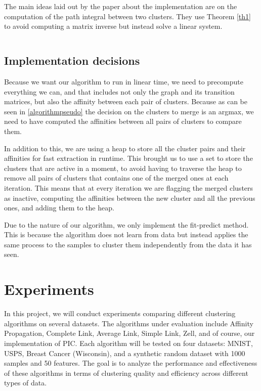 \documentclass[
	10pt,
	parskip=half-,	
	paper=a4,
	english
	]{scrartcl}
\begin{document}
The main ideas laid out by the paper about the implementation are on the computation of the path integral between two clusters. They use Theorem \ref{th1} to avoid computing a matrix inverse but instead solve a linear system.

\begin{equation}
    \label{th1}
\end{equation}


\subsection{Implementation decisions}

Because we want our algorithm to run in linear time, we need to precompute everything we can, and that includes not only the graph and its transition matrices, but also the affinity between each pair of clusters. Because as can be seen in \ref{algorithmpseudo} the decision on the clusters to merge is an argmax, we need to have computed the affinities between all pairs of clusters to compare them.

In addition to this, we are using a heap to store all the cluster pairs and their affinities for fast extraction in runtime. This brought us to use a set to store the clusters that are active in a moment, to avoid having to traverse the heap to remove all pairs of clusters that contains one of the merged ones at each iteration. This means that at every iteration we are flagging the merged clusters as inactive, computing the affinities between the new cluster and all the previous ones, and adding them to the heap.

Due to the nature of our algorithm, we only implement the fit-predict method. This is because the algorithm does not learn from data but instead applies the same process to the samples to cluster them independently from the data it has seen.

\section {Experiments}

In this project, we will conduct experiments comparing different clustering algorithms on several datasets. The algorithms under evaluation include Affinity Propagation, Complete Link, Average Link, Simple Link, Zell, and of course, our implementation of PIC. Each algorithm will be tested on four datasets: MNIST, USPS, Breast Cancer (Wisconsin), and a synthetic random dataset with 1000 samples and 50 features. The goal is to analyze the performance and effectiveness of these algorithms in terms of clustering quality and efficiency across different types of data.
\end{document}
